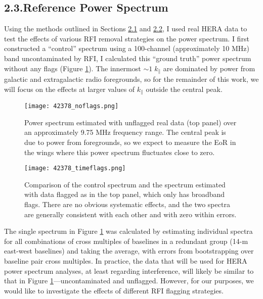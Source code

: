 \documentclass[12pt]{article}
\begin{document}
\tocless\subsection{\hypertarget{subsec:refpspec}{2.3.\hspace{0.75em}Reference Power Spectrum}}

Using the methods outlined in Sections \hyperlink{subsec:h1crfi}{2.1} and \hyperlink{subsec:pspecestimation}{2.2}, I used real HERA data to test the effects of various RFI removal strategies on the power spectrum. I first constructed a ``control'' spectrum using a 100-channel (approximately 10 MHz) band uncontaminated by RFI, I calculated this ``ground truth'' power spectrum without any flags (Figure \ref{fig:noflags}). The innermost $\sim 1 \; k_\parallel$ are dominated by power from galactic and extragalactic radio foregrounds, so for the remainder of this work, we will focus on the effects at larger values of $k_\parallel$ outside the central peak.

\begin{figure}[p]
	\centering
	\texttt{[image: 42378\_noflags.png]}
	\caption[Original power spectrum]{Power spectrum estimated with unflagged real data (top panel) over an approximately 9.75 MHz frequency range. The central peak is due to power from foregrounds, so we expect to measure the EoR in the wings where this power spectrum fluctuates close to zero.}
	\label{fig:noflags}
\end{figure}

\begin{figure}[p]
	\centering
	\texttt{[image: 42378\_timeflags.png]}
	\caption[Power spectrum calculated with data flagged only in time]{Comparison of the control spectrum and the spectrum estimated with data flagged as in the top panel, which only has broadband flags. There are no obvious systematic effects, and the two spectra are generally consistent with each other and with zero within errors.}
	\label{fig:time_flags}
\end{figure}

The single spectrum in Figure \ref{fig:noflags} was calculated by estimating individual spectra for all combinations of cross multiples of baselines in a redundant group (14-m east-west baselines) and taking the average, with errors from bootstrapping over baseline pair cross multiples.  In practice, the data that will be used for HERA power spectrum analyses, at least regarding interference, will likely be similar to that in Figure \ref{fig:noflags}---uncontaminated and unflagged. However, for our purposes, we would like to investigate the effects of different RFI flagging strategies.
\end{document}
